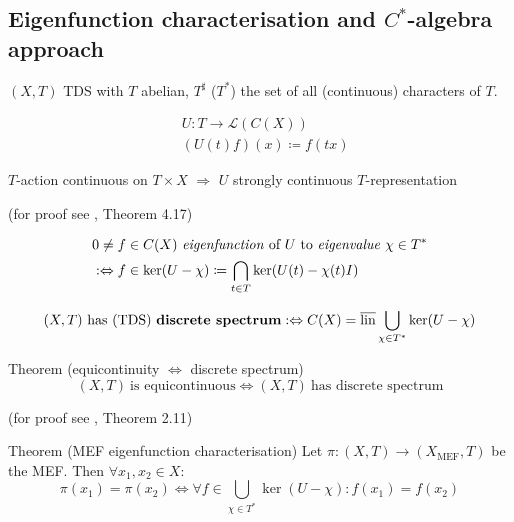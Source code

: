 \subsection{Eigenfunction characterisation and $C^*$-algebra approach}
\begin{frame}
  $(X,T)$ TDS with $T$ abelian, $T^\sharp$ ($T^*$) the set of all (continuous) characters of $T$.
\begin{definition}
  \begin{equation*}
    \begin{split}
      &U : T \longrightarrow \mathscr{L}(C(X)) \\
      &(U(t) f)(x) \coloneq f(tx)
    \end{split}
  \end{equation*}
   \end{definition}
   \begin{remark}
    $T$-action continuous on $T \times X$ $\Rightarrow$ $U$ strongly continuous $T$-representation

    \hfill(for proof see \cite{OpThErg}, Theorem 4.17)
   \end{remark}
   \pause
   \begin{definition}
   \begin{equation*}
    \begin{split}
      &0 \neq f \in C(X) \ \text{\emph{eigenfunction} of} \ U \ \text{to \emph{eigenvalue}} \ \chi \in T^*   \\
 &:\Leftrightarrow f \in \ker (U-\chi)\coloneq \bigcap_{t \in T} \ker (U(t)- \chi (t)I)
    \end{split}
      \end{equation*}
   \end{definition}
\end{frame}
\begin{frame}[fragile]
  \begin{definition}
  \begin{equation*}
    (X,T) \ \text{has (TDS) \textbf{discrete spectrum}}:\Leftrightarrow C(X) = \overline{\operatorname{lin}} \bigcup_{\chi \in T^*} \ker (U- \chi)
  \end{equation*}
\end{definition}
\pause 
  \begin{alertblock}{Theorem (equicontinuity $\Leftrightarrow$ discrete spectrum)}%
  \begin{equation*}
    (X,T) \ \text{is equicontinuous} \Leftrightarrow (X,T) \ \text{has discrete spectrum}
  \end{equation*}

    \hfill(for proof see \cite{HK2023}, Theorem 2.11)
\end{alertblock}
\pause
  \begin{alertblock}{Theorem (MEF eigenfunction characterisation)}
  \label{thm:MEF_EFchar}
  Let $\pi : (X,T) \to (X_{\text{MEF}},T)$ be the MEF.
  Then $\forall x_1, x_2 \in X$:
  \begin{equation*}
  \pi (x_1) = \pi (x_2) \Leftrightarrow 
    \forall f \in \bigcup_{\chi \in T^*} \ker (U- \chi) : f(x_1) = f(x_2)
  \end{equation*}
\end{alertblock}
\end{frame}
